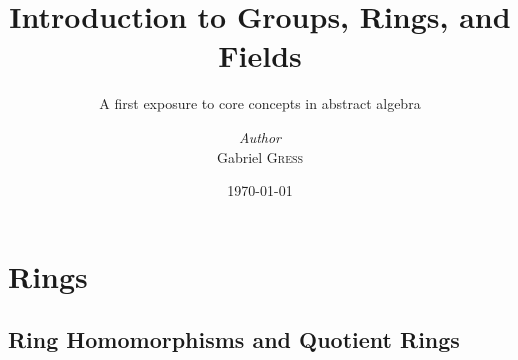\documentclass[oneside]{memoir}
\institute{Rice University}
\title{Introduction to Groups, Rings, and Fields}
\subtitle{A first exposure to core concepts in abstract algebra}
\author{\textit{Author}\\Gabriel \textsc{Gress}}
\date{\today}
\begin{document}

\maketitle

\tableofcontents








%
%

%
%
%

%
%

\chapter{Rings}
\label{cha:rings}




\section{Ring Homomorphisms and Quotient Rings}









%

\end{document}
